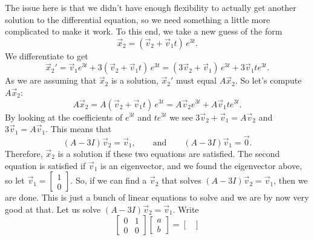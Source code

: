 \documentclass{ximera}
\begin{document}
\begin{example}
    The issue here is that we didn't have enough flexibility to actually get another solution to the differential equation, so we need something a little more complicated to make it work. To this end, we take a new guess of the form
    \begin{equation*}
        \vec{x}_2 = ( \vec{v}_2 +  \vec{v}_1 t )\, e^{3t} .
    \end{equation*}
    We differentiate to get
    \begin{equation*}
        {\vec{x}_2}' = \vec{v}_1 e^{3t} + 3 ( \vec{v}_2 +  \vec{v}_1 t )\, e^{3t} = ( 3 \vec{v}_2 + \vec{v}_1 )\, e^{3t} +  3 \vec{v}_1 t e^{3t} .
    \end{equation*}
    As we are assuming that $\vec{x}_2$ is a solution, ${\vec{x}_2}'$ must equal $A \vec{x}_2$. So let's compute $A \vec{x}_2$:
    \begin{equation*}
        A \vec{x}_2 =  A ( \vec{v}_2 +  \vec{v}_1 t )\, e^{3t} = A \vec{v}_2 e^{3t} +  A \vec{v}_1 t e^{3t} .
    \end{equation*}
    By looking at the coefficients of $e^{3t}$ and $t e^{3t}$ we see $3 \vec{v}_2 + \vec{v}_1 = A \vec{v}_2$ and $3 \vec{v}_1 = A \vec{v}_1$. This means that
    \begin{equation*}
        (A-3I)\vec{v}_2 = \vec{v}_1, \qquad \text{and} \qquad (A-3I)\vec{v}_1 = \vec{0}.
    \end{equation*}
    Therefore, $\vec{x}_2$ is a solution if these two equations are satisfied. The second equation is satisfied if $\vec{v}_1$ is an eigenvector, and we found the eigenvector above, so let
    $\vec{v}_1 = \left[ \begin{smallmatrix} 1 \\ 0 \end{smallmatrix} \right]$. So, if we can find a $\vec{v}_2$ that solves %
    $(A-3I)\vec{v}_2 = \vec{v}_1$, then we are done. This is just a bunch of linear equations to solve and we are by now very good at that. Let us solve $(A-3I)\vec{v}_2 = \vec{v}_1$.  Write
    \begin{equation*}
        \begin{bmatrix}
            0 & 1 \\ 
            0 & 0
        \end{bmatrix}
        \begin{bmatrix}
            a \\ 
            b
        \end{bmatrix}
        =
        \begin{bmatrix}

\end{bmatrix}
\end{equation*}
\end{example}
\end{document}
